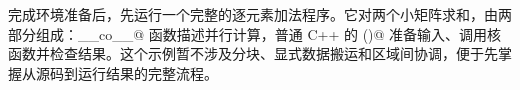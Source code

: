 完成环境准备后，先运行一个完整的逐元素加法程序。它对两个小矩阵求和，由两部分组成：\co@__co__@ 函数描述并行计算，普通 C++ 的 \co@main()@ 准备输入、调用核函数并检查结果。这个示例暂不涉及分块、显式数据搬运和区域间协调，便于先掌握从源码到运行结果的完整流程。
